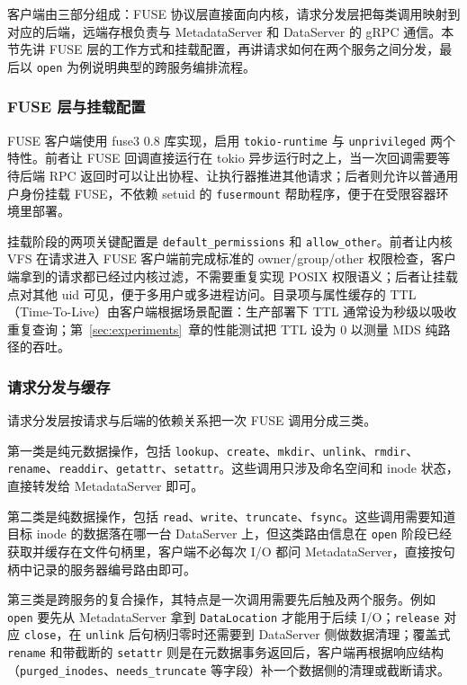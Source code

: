 客户端由三部分组成：FUSE 协议层直接面向内核，请求分发层把每类调用映射到对应的后端，远端存根负责与 MetadataServer 和 DataServer 的 gRPC 通信。本节先讲 FUSE 层的工作方式和挂载配置，再讲请求如何在两个服务之间分发，最后以 \texttt{open} 为例说明典型的跨服务编排流程。

\subsubsection{FUSE 层与挂载配置}

FUSE 客户端使用 fuse3 0.8 库实现，启用 \texttt{tokio-runtime} 与 \texttt{unprivileged} 两个特性。前者让 FUSE 回调直接运行在 tokio 异步运行时之上，当一次回调需要等待后端 RPC 返回时可以让出协程、让执行器推进其他请求；后者则允许以普通用户身份挂载 FUSE，不依赖 setuid 的 \texttt{fusermount} 帮助程序，便于在受限容器环境里部署。

挂载阶段的两项关键配置是 \texttt{default\_permissions} 和 \texttt{allow\_other}。前者让内核 VFS 在请求进入 FUSE 客户端前完成标准的 owner/group/other 权限检查，客户端拿到的请求都已经过内核过滤，不需要重复实现 POSIX 权限语义；后者让挂载点对其他 uid 可见，便于多用户或多进程访问。目录项与属性缓存的 TTL（Time-To-Live）由客户端根据场景配置：生产部署下 TTL 通常设为秒级以吸收重复查询；第~\ref{sec:experiments}~章的性能测试把 TTL 设为 0 以测量 MDS 纯路径的吞吐。

\subsubsection{请求分发与缓存}

请求分发层按请求与后端的依赖关系把一次 FUSE 调用分成三类。

第一类是纯元数据操作，包括 \texttt{lookup}、\texttt{create}、\texttt{mkdir}、\texttt{unlink}、\texttt{rmdir}、\texttt{rename}、\texttt{readdir}、\texttt{getattr}、\texttt{setattr}。这些调用只涉及命名空间和 inode 状态，直接转发给 MetadataServer 即可。

第二类是纯数据操作，包括 \texttt{read}、\texttt{write}、\texttt{truncate}、\texttt{fsync}。这些调用需要知道目标 inode 的数据落在哪一台 DataServer 上，但这类路由信息在 \texttt{open} 阶段已经获取并缓存在文件句柄里，客户端不必每次 I/O 都问 MetadataServer，直接按句柄中记录的服务器编号路由即可。

第三类是跨服务的复合操作，其特点是一次调用需要先后触及两个服务。例如 \texttt{open} 要先从 MetadataServer 拿到 \texttt{DataLocation} 才能用于后续 I/O；\texttt{release} 对应 \texttt{close}，在 \texttt{unlink} 后句柄归零时还需要到 DataServer 侧做数据清理；覆盖式 \texttt{rename} 和带截断的 \texttt{setattr} 则是在元数据事务返回后，客户端再根据响应结构（\texttt{purged\_inodes}、\texttt{needs\_truncate} 等字段）补一个数据侧的清理或截断请求。

